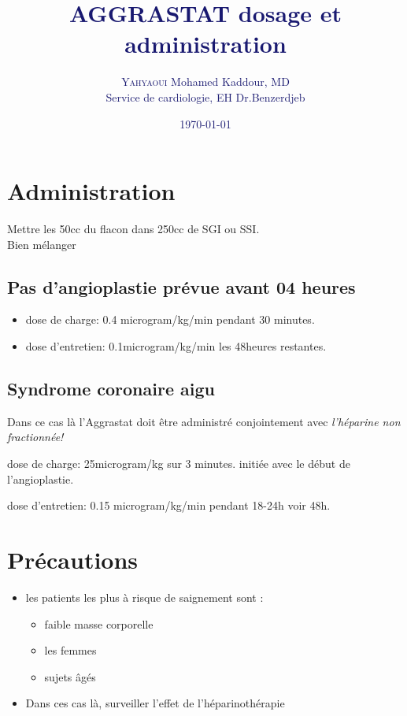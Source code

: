 \documentclass[11pt]{article}
\title{\textcolor{MidnightBlue}{\textbf{AGGRASTAT dosage et  administration}}}
\author{\textcolor{MidnightBlue}{\textsc{Yahyaoui} Mohamed Kaddour, \textsc{MD}}\\
		\textcolor{MidnightBlue}{Service de cardiologie, EH Dr.Benzerdjeb}}
\date{\textcolor{MidnightBlue}{\today}}
\begin{document}
\maketitle

\section{Administration}

Mettre les 50cc du flacon dans 250cc de SGI ou SSI.\\
Bien mélanger \\
\subsection{Pas d'angioplastie prévue avant 04 heures}
\begin{itemize}
\item{dose de charge: 0.4 microgram/kg/min pendant 30 minutes.}
\item{dose d'entretien: 0.1microgram/kg/min les 48heures restantes.}
\end{itemize}
\subsection{Syndrome coronaire aigu}
Dans ce cas là l'Aggrastat doit être administré conjointement avec \emph{l'héparine non fractionnée!} \\
\begin{itemize}
\item{dose de charge: 25microgram/kg sur 3 minutes. \hfill initiée avec le début de l'angioplastie.
\item{dose d'entretien: 0.15 microgram/kg/min pendant 18-24h voir 48h.} }
\end{itemize}
\section{Précautions}
\begin{itemize}
\item{les patients les plus à risque de saignement sont :
    \begin{itemize}
        \item{faible masse corporelle}
        \item{les femmes}
        \item{sujets âgés}
    \end{itemize}}
\item{Dans ces cas là, surveiller l'effet de l'héparinothérapie}
\end{itemize}
\end{document}
